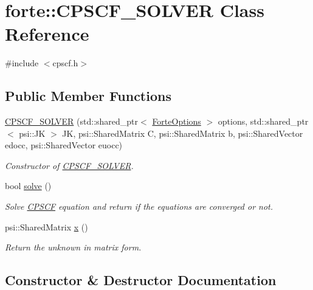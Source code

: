 \hypertarget{classforte_1_1_c_p_s_c_f___s_o_l_v_e_r}{}\section{forte\+:\+:C\+P\+S\+C\+F\+\_\+\+S\+O\+L\+V\+ER Class Reference}
\label{classforte_1_1_c_p_s_c_f___s_o_l_v_e_r}


{\ttfamily \#include $<$cpscf.\+h$>$}

\subsection*{Public Member Functions}
\begin{DoxyCompactItemize}
\item 
\mbox{\hyperlink{classforte_1_1_c_p_s_c_f___s_o_l_v_e_r_abf8d542e0f97464c9fd03dfa2d2528d8}{C\+P\+S\+C\+F\+\_\+\+S\+O\+L\+V\+ER}} (std\+::shared\+\_\+ptr$<$ \mbox{\hyperlink{classforte_1_1_forte_options}{Forte\+Options}} $>$ options, std\+::shared\+\_\+ptr$<$ psi\+::\+JK $>$ JK, psi\+::\+Shared\+Matrix C, psi\+::\+Shared\+Matrix b, psi\+::\+Shared\+Vector edocc, psi\+::\+Shared\+Vector euocc)
\begin{DoxyCompactList}\small\item\em Constructor of \mbox{\hyperlink{classforte_1_1_c_p_s_c_f___s_o_l_v_e_r}{C\+P\+S\+C\+F\+\_\+\+S\+O\+L\+V\+ER}}. \end{DoxyCompactList}\item 
bool \mbox{\hyperlink{classforte_1_1_c_p_s_c_f___s_o_l_v_e_r_ac210c880f297904efa59bfc46881ca9b}{solve}} ()
\begin{DoxyCompactList}\small\item\em Solve \mbox{\hyperlink{classforte_1_1_c_p_s_c_f}{C\+P\+S\+CF}} equation and return if the equations are converged or not. \end{DoxyCompactList}\item 
psi\+::\+Shared\+Matrix \mbox{\hyperlink{classforte_1_1_c_p_s_c_f___s_o_l_v_e_r_a3d1a12199bb5114f71216738404f8fce}{x}} ()
\begin{DoxyCompactList}\small\item\em Return the unknown in matrix form. \end{DoxyCompactList}\end{DoxyCompactItemize}


\subsection{Constructor \& Destructor Documentation}
\mbox{\label{classforte_1_1_c_p_s_c_f___s_o_l_v_e_r_abf8d542e0f97464c9fd03dfa2d2528d8}} 
